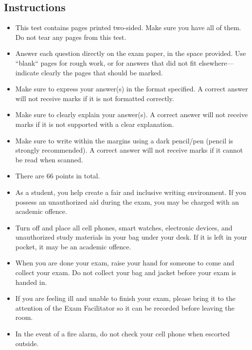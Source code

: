 \documentclass[12pt]{article}
\begin{document}
\subsection*{Instructions}
\begin{itemize}
  \item This test contains \pageref{LastPage} pages printed two-sided. Make sure you have all of them. Do not tear any pages from this test.
  \item Answer each question directly on the exam paper, in the space provided. Use ``blank`` pages for rough work, or
for answers that did not fit elsewhere—indicate clearly the pages that should be marked.
  \item Make sure to express your answer(s) in the format specified. A correct answer will not receive marks if it is not formatted correctly.
\item Make sure to clearly explain your answer(s). A correct answer will not receive marks if it is not supported with a clear explanation.
  \item Make sure to write within the margins using a dark pencil/pen (pencil is strongly recommended). A correct answer will not receive marks if it cannot be read when scanned.
  \item There are 66 points in total.
  \item As a student, you help create a fair and inclusive writing environment. If you possess an unauthorized aid during
the exam, you may be charged with an academic offence.
\item Turn off and place all cell phones, smart watches, electronic devices, and unauthorized study materials in your
bag under your desk. If it is left in your pocket, it may be an academic offence.
\item When you are done your exam, raise your hand for someone to come and collect your exam. Do not collect your
bag and jacket before your exam is handed in.
\item If you are feeling ill and unable to finish your exam, please bring it to the attention of the Exam Facilitator so it can be recorded before leaving the room.
\item In the event of a fire alarm, do not check your cell phone when escorted outside.
\end{itemize}
\clearpage

\lstset{style=mypython} %
\end{document}
